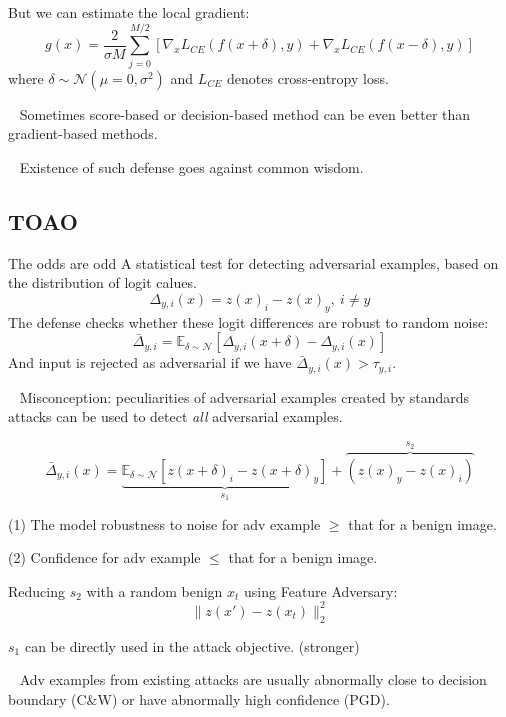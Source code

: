 \documentclass[12,times]{beamer}
\begin{document}
\begin{frame}
	But we can estimate the local gradient:
$$ g(x) = \frac{2}{\sigma M} \sum_{j=0}^{M/2}
[ \nabla_x L_{CE}(f(x+\delta), y) +
\nabla_x L_{CE}(f(x-\delta), y)] $$
where $\delta \sim \mathcal{N}(\mu = 0,\sigma^2)$
and $L_{CE}$ denotes cross-entropy loss.

\textbullet~ Sometimes score-based or decision-based method can be even better than gradient-based methods.

\textbullet~ Existence of such defense goes against common wisdom.
\end{frame}

\subsection{TOAO}
\begin{frame}{The odds are odd}
	A statistical test for detecting adversarial examples, based on the distribution of logit calues.
	$$ \Delta_{y,i}(x) = z(x)_i - z(x)_y, ~i\neq y$$
	The defense checks whether these logit differences are robust to random noise:
	$$ \bar{\Delta}_{y,i} = \mathbb{E}_{\delta \sim \mathcal{N}}
	[\Delta_{y,i} (x+\delta) - \Delta_{y,i}(x)]$$
	And input is rejected as adversarial if we have $\bar{\Delta}_{y,i}(x)
	> \tau_{y,i}$.
	
	\textbullet~ Misconception: peculiarities of adversarial examples
	created by standards attacks can be used to detect {\it all} adversarial
	examples.
\end{frame}

\begin{frame}
	$$\bar{\Delta}_{y,i}(x) = \underbrace{\mathbb{E}_{\delta \sim \mathcal{N}}
	[ z(x+\delta)_i - z(x+\delta)_y ]}_{s_1} + 
	\overbrace{(z(x)_y - z(x)_i)}^{s_2} $$
	
	(1) The model robustness to noise for adv example $\geq$ that for a benign image.
	
	(2) Confidence for adv example $\leq$ that for a benign image.
	
	Reducing $s_2$ with a random benign $x_t$ using Feature Adversary:
	 $$ \|z(x') - z(x_t)\|_2^2 $$
	
	$s_1$ can be directly used in the attack objective. (stronger)
	
	\textbullet~ Adv examples from existing attacks are usually abnormally close to decision boundary (C\&W) or have abnormally high confidence (PGD).
\end{frame}
\end{document}
